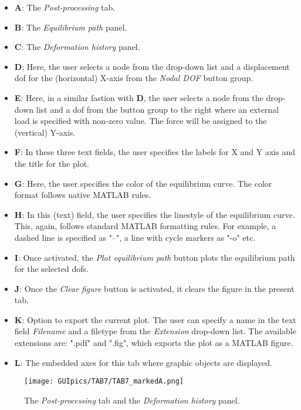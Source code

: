 \begin{itemize}
	\item \textbf{A}: The \textit{Post-processing} tab.
	\item \textbf{B}: The \textit{Equilibrium path} panel.
	\item \textbf{C}: The \textit{Deformation history} panel.
	\item \textbf{D}: Here, the user selects a node from the drop-down list and 
	a displacement \acrshort{dof} for the (horizontal) X-axis from the 
	\textit{Nodal DOF} button group.
	\item \textbf{E}: Here, in a similar fastion with \textbf{D}, the user 
	selects a node from the drop-down list and a \acrshort{dof} from the button 
	group to the right where an external load is specified with non-zero value. 
	The force will be assigned to the (vertical) Y-axis.
	
	\item \textbf{F}: In these three text fields, the user specifies the labels 
	for X and Y axis and the title for the plot.
	
	\item \textbf{G}: Here, the user specifies the color of the equilibrium 
	curve. The color format follows native MATLAB rules.
	\item \textbf{H}: In this (text) field, the user specifies the linestyle of 
	the equilibrium curve. This, again, follows standard MATLAB formatting 
	rules. For example, a dashed line is specified as "--", a line with cycle 
	markers as "-o" etc.
	
	\item \textbf{I}: Once activated, the \textit{Plot equilibrium path} button 
	plots the equilibrium path for the selected \acrshort{dof}s.
	\item \textbf{J}: Once the \textit{Clear figure} button is activated, it 
	clears the figure in the present tab.
	\item \textbf{K}: Option to export the current plot. The user can specify a 
	name in the text field \textit{Filename} and a filetype from the 
	\textit{Extension} drop-down list. The available extensions are: ".pdf" and 
	".fig", which exports the plot as a MATLAB figure.
	\item \textbf{L}: The embedded axes for this tab where graphic objects are 
	displayed.
	
\end{itemize}

\begin{figure}
	\centering
	\texttt{[image: GUIpics/TAB7/TAB7\_markedA.png]}
	\caption{The \textit{Post-processing} tab and the \textit{Deformation 
			history} panel.}
	\label{fig:TAB7_markedA}
\end{figure}

